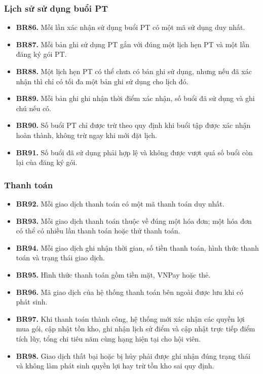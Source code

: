 \documentclass[11pt, a4paper]{article}
\begin{document}
\subsubsection{Lịch sử sử dụng buổi PT}
\begin{itemize}
    \item \textbf{BR86.} Mỗi lần xác nhận sử dụng buổi PT có một mã sử dụng duy nhất.
    \item \textbf{BR87.} Mỗi bản ghi sử dụng PT gắn với đúng một lịch hẹn PT và một lần đăng ký gói PT.
    \item \textbf{BR88.} Một lịch hẹn PT có thể chưa có bản ghi sử dụng, nhưng nếu đã xác nhận thì chỉ có tối đa một bản ghi sử dụng cho lịch đó.
    \item \textbf{BR89.} Mỗi bản ghi ghi nhận thời điểm xác nhận, số buổi đã sử dụng và ghi chú nếu có.
    \item \textbf{BR90.} Số buổi PT chỉ được trừ theo quy định khi buổi tập được xác nhận hoàn thành, không trừ ngay khi mới đặt lịch.
    \item \textbf{BR91.} Số buổi đã sử dụng phải hợp lệ và không được vượt quá số buổi còn lại của đăng ký gói.
\end{itemize}

\subsubsection{Thanh toán}
\begin{itemize}
    \item \textbf{BR92.} Mỗi giao dịch thanh toán có một mã thanh toán duy nhất.
    \item \textbf{BR93.} Mỗi giao dịch thanh toán thuộc về đúng một hóa đơn; một hóa đơn có thể có nhiều lần thanh toán hoặc thử thanh toán.
    \item \textbf{BR94.} Mỗi giao dịch ghi nhận thời gian, số tiền thanh toán, hình thức thanh toán và trạng thái giao dịch.
    \item \textbf{BR95.} Hình thức thanh toán gồm tiền mặt, VNPay hoặc thẻ.
    \item \textbf{BR96.} Mã giao dịch của hệ thống thanh toán bên ngoài được lưu khi có phát sinh.
    \item \textbf{BR97.} Khi thanh toán thành công, hệ thống mới xác nhận các quyền lợi mua gói, cập nhật tồn kho, ghi nhận lịch sử điểm và cập nhật trực tiếp điểm tích lũy, tổng chi tiêu năm cùng hạng hiện tại cho hội viên.
    \item \textbf{BR98.} Giao dịch thất bại hoặc bị hủy phải được ghi nhận đúng trạng thái và không làm phát sinh quyền lợi hay trừ tồn kho sai quy định.
\end{itemize}
\end{document}
